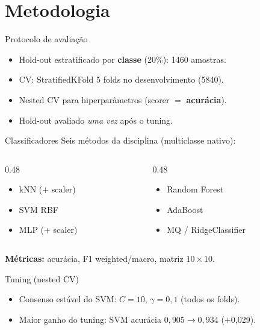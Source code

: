 \documentclass[aspectratio=169,11pt]{beamer}
\begin{document}
\section{Metodologia}

\begin{frame}{Protocolo de avaliação}
  \begin{itemize}
    \item Hold-out estratificado por \textbf{classe} (20\%): 1460 amostras.
    \item CV: StratifiedKFold 5 folds no desenvolvimento (5840).
    \item Nested CV para hiperparâmetros (scorer $=$ \textbf{acurácia}).
    \item Hold-out avaliado \emph{uma vez} após o tuning.
  \end{itemize}
\end{frame}

\begin{frame}{Classificadores}
  Seis métodos da disciplina (multiclasse nativo):
  \begin{columns}[T]
    \begin{column}{0.48\textwidth}
      \begin{itemize}
        \item kNN (+ scaler)
        \item SVM RBF
        \item MLP (+ scaler)
      \end{itemize}
    \end{column}
    \begin{column}{0.48\textwidth}
      \begin{itemize}
        \item Random Forest
        \item AdaBoost
        \item MQ / RidgeClassifier
      \end{itemize}
    \end{column}
  \end{columns}
  \vspace{0.8em}
  \textbf{Métricas:} acurácia, F1 weighted/macro, matriz $10\times 10$.
\end{frame}

\begin{frame}{Tuning (nested CV)}
  \begin{itemize}
    \item Consenso estável do SVM: $C{=}10$, $\gamma{=}0{,}1$ (todos os folds).
    \item Maior ganho do tuning: SVM acurácia $0{,}905\rightarrow 0{,}934$ (+0{,}029).
  \end{itemize}
\end{frame}
\end{document}
